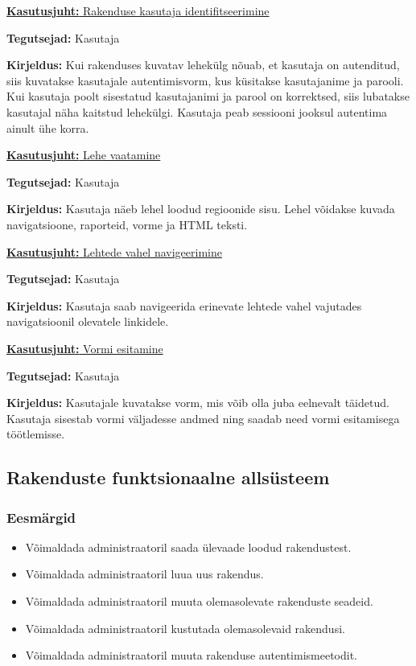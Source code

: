 \documentclass[a4paper,12pt]{article} %
\begin{document}
\underline{\textbf{Kasutusjuht:} Rakenduse kasutaja identifitseerimine}
\par
\textbf{Tegutsejad:} Kasutaja
\par
\textbf{Kirjeldus:} Kui rakenduses kuvatav lehekülg nõuab, et kasutaja on autenditud, siis kuvatakse kasutajale autentimisvorm, kus küsitakse kasutajanime ja parooli. Kui kasutaja poolt sisestatud kasutajanimi ja parool on korrektsed, siis lubatakse kasutajal näha kaitstud lehekülgi. Kasutaja peab sessiooni jooksul autentima ainult ühe korra.
\par

\underline{\textbf{Kasutusjuht:} Lehe vaatamine}
\par
\textbf{Tegutsejad:} Kasutaja
\par
\textbf{Kirjeldus:} Kasutaja näeb lehel loodud regioonide sisu. Lehel võidakse kuvada navigatsioone, raporteid, vorme ja HTML teksti.
\par

\underline{\textbf{Kasutusjuht:} Lehtede vahel navigeerimine}
\par
\textbf{Tegutsejad:} Kasutaja
\par
\textbf{Kirjeldus:} Kasutaja saab navigeerida erinevate lehtede vahel vajutades navigatsioonil olevatele linkidele.
\par

\underline{\textbf{Kasutusjuht:} Vormi esitamine}
\par
\textbf{Tegutsejad:} Kasutaja
\par
\textbf{Kirjeldus:} Kasutajale kuvatakse vorm, mis võib olla juba eelnevalt täidetud. Kasutaja sisestab vormi väljadesse andmed ning saadab need vormi esitamisega töötlemisse.
\par

\subsection{Rakenduste funktsionaalne allsüsteem}
\subsubsection{Eesmärgid}
\begin{itemize}
\item Võimaldada administraatoril saada ülevaade loodud rakendustest.
\item Võimaldada administraatoril luua uus rakendus.
\item Võimaldada administraatoril muuta olemasolevate rakenduste seadeid.
\item Võimaldada administraatoril kustutada olemasolevaid rakendusi.
\item Võimaldada administraatoril muuta rakenduse autentimismeetodit.
\end{itemize}
\end{document}
